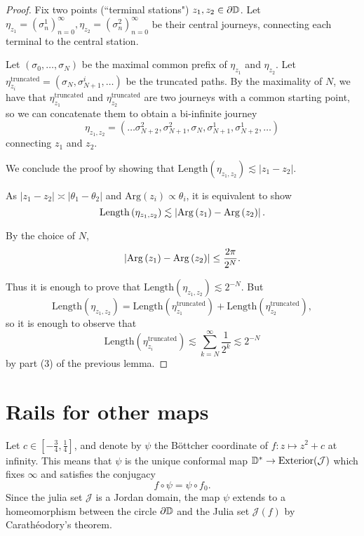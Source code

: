 \begin{proof}
Fix two points (“terminal stations") $z_{1},z_{2}\in\partial\mathbb{D}$.
Let $\eta_{z_{1}}=\left(\sigma_{n}^{1}\right)_{n=0}^{\infty},\eta_{z_{2}}=\left(\sigma_{n}^{2}\right)_{n=0}^{\infty}$
be their central journeys, connecting each terminal to the central
station.

Let $\left(\sigma_{0},\ldots,\sigma_{N}\right)$ be the maximal common
prefix of $\eta_{z_{1}}$ and $\eta_{z_{2}}$. Let $\eta_{z_{i}}^{\text{truncated}}=\left(\sigma_{N},\sigma_{N+1}^{i},\ldots\right)$
be the truncated paths. By the maximality of $N$, we have that $\eta_{z_{1}}^{\text{truncated}}$
and $\eta_{z_{2}}^{\text{truncated}}$ are two journeys with a common
starting point, so we can concatenate them to obtain a bi-infinite
journey 
\[
\eta_{z_{1},z_{2}}=\left(\ldots\sigma_{N+2}^{2},\sigma_{N+1}^{2},\sigma_{N},\sigma_{N+1}^{1},\sigma_{N+2}^{1},\ldots\right)
\]
 connecting $z_{1}$ and $z_{2}$.


We conclude the proof by showing that $\mathrm{Length}\left(\eta_{z_{1},z_{2}}\right)\lesssim\left|z_{1}-z_{2}\right|$.

As $\left|z_{1}-z_{2}\right|\asymp\left|\theta_{1}-\theta_{2}\right|$
and $\mathrm{Arg}\left(z_{i}\right)\propto\theta_{i}$, it is equivalent
to show
\[
\mathrm{Length}\left(\eta_{z_{1},z_{2}}\right)\lesssim\left|\mathrm{Arg}\left(z_{1}\right)-\mathrm{Arg}\left(z_{2}\right)\right|.
\]

By the choice of $N$, 
\[
\left|\mathrm{Arg}\left(z_{1}\right)-\mathrm{Arg}\left(z_{2}\right)\right|\leq\frac{2\pi}{2^{N}}.
\]

Thus it is enough to prove that $\mathrm{Length}\left(\eta_{z_{1},z_{2}}\right)\lesssim2^{-N}$.
But 
\[
\mathrm{Length}\left(\eta_{z_{1},z_{2}}\right)=\mathrm{Length}\left(\eta_{z_{1}}^{\text{truncated}}\right)+\mathrm{Length}\left(\eta_{z_{2}}^{\text{truncated}}\right),
\]
so it is enough to observe that 
\[
\mathrm{Length}\left(\eta_{z_{i}}^{\text{truncated}}\right)\lesssim\sum_{k=N}^{\infty}\frac{1}{2^{k}}\lesssim2^{-N}
\]
by part (3) of the previous lemma.

\end{proof}









\section{Rails for other maps}
Let $c\in\left[-\frac 34,\frac{1}{4}\right]$, and denote by $\psi$ the Böttcher coordinate of $f: z\mapsto z^2+c$ at infinity. 
This means that $\psi$ is the unique conformal map $\mathbb{D}^{*}\to\mathrm{Exterior}(\mathcal{J})$  which fixes $\infty$ and satisfies the conjugacy $$f\circ\psi=\psi\circ f_{0}.$$
Since the julia set $\mathcal J$ is a Jordan domain, the map $\psi$ extends to a homeomorphism between the circle
$\partial\mathbb{D}$ and the Julia set $\mathcal{J}(f)$ by Carathéodory's
theorem.

